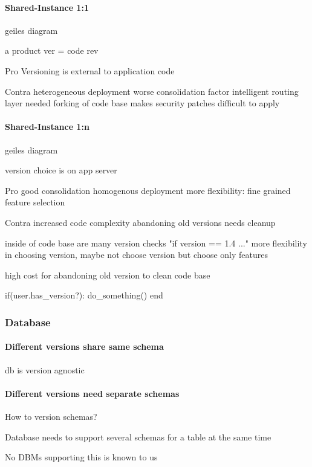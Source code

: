 \paragraph{Shared-Instance 1:1}
geiles diagram

a product ver = code rev


Pro
Versioning is external to application code

Contra
heterogeneous deployment
worse consolidation factor
intelligent routing layer needed
forking of code base makes security patches difficult to apply



\paragraph{Shared-Instance 1:n}
geiles diagram


version choice is on app server


Pro
good consolidation
homogenous deployment
more flexibility: fine grained feature selection

Contra
increased code complexity
abandoning old versions needs cleanup



inside of code base are many version checks "if version == 1.4 ..."
more flexibility in choosing version, maybe not choose version but choose only features

high cost for abandoning old version to clean code base

if(user.has_version?):
  do_something()
end

\subsubsection{Database}

\paragraph{Different versions share same schema}
db is version agnostic

\paragraph{Different versions need separate schemas}
How to version schemas?

  Database needs to support several schemas for a table at the same time

  No DBMs supporting this is known to us

